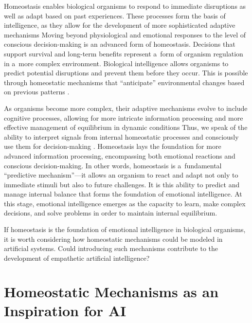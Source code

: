 \documentclass[%
  manuscript=article,
  year=2024,
  volume=77,
  doi=00000.000,
]{zfn}
\begin{document}
Homeostasis enables biological organisms to respond to immediate disruptions as well as adapt based on past experiences. These processes form the basis of intelligence, as they allow for the development of more sophisticated adaptive mechanisms 
\parencite[][]{torday_cell_2015} %
 Moving beyond physiological and emotional responses to the level of conscious decision-making is an advanced form of homeostasis. Decisions that support survival and long-term benefits represent a~form of organism regulation in a~more complex environment. Biological intelligence allows organisms to predict potential disruptions and prevent them before they occur. This is possible through homeostatic mechanisms that ``anticipate'' environmental changes based on previous patterns 
\parencite[][]{eskov_evolution_2017}.%
~



As organisms become more complex, their adaptive mechanisms evolve to include cognitive processes, allowing for more intricate information processing and more effective management of equilibrium in dynamic conditions 
\parencite[][]{davies_adaptive_2016} %
 Thus, we speak of the ability to interpret signals from internal homeostatic processes and consciously use them for decision-making 
\parencite[][]{billman_homeostasis_2013}. %
 Homeostasis lays the foundation for more advanced information processing, encompassing both emotional reactions and conscious decision-making. In other words, homeostasis is a~fundamental ``predictive mechanism''---it allows an organism to react and adapt not only to immediate stimuli but also to future challenges. It is this ability to predict and manage internal balance that forms the foundation of emotional intelligence. At this stage, emotional intelligence emerges as the capacity to learn, make complex decisions, and solve problems in order to maintain internal equilibrium.



If homeostasis is the foundation of emotional intelligence in biological organisms, it is worth considering how homeostatic mechanisms could be modeled in artificial systems. Could introducing such mechanisms contribute to the development of empathetic artificial intelligence?



\section*{Homeostatic Mechanisms as an Inspiration for AI}
\end{document}

